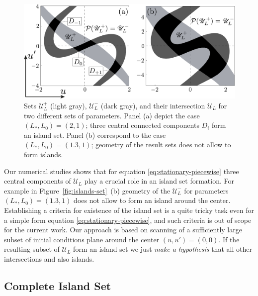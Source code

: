 \begin{figure}[h]
\centering
	\includegraphics[scale = 1]{pic/island set for piecewise equation}
	\caption{
		Sets $\mathscr{U}_L^+$ (light gray), $\mathscr{U}_L^-$ (dark gray), and their intersection $\mathscr{U}_L$ for two different sets of parameters.
		Panel (a) depict the case $(L_*, L_0) = (2, 1)$; three central connected components $D_i$ form an island set.
		Panel (b) correspond to the case $(L_*, L_0) = (1.3, 1)$; geometry of the result sets does not allow to form islands.
	}
\label{fig:island-set-piecewise}
\end{figure}

Our numerical studies shows that for equation \eqref{eq:stationary-piecewise} three central components of $\mathscr{U}_L$ play a crucial role in an island set formation.
For example in Figure~\ref{fig:islands-set}~(b) geometry of the $\mathscr{U}_L^-$ for parameters $(L_*, L_0) = (1.3, 1)$ does not allow to form an island around the center.
Establishing a criteria for existence of the island set is a quite tricky task even for a simple form equation \eqref{eq:stationary-piecewise}, and such criteria is out of scope for the current work.
Our approach is based on scanning of a sufficiently large subset of initial conditions plane around the center $(u, u') = (0, 0)$.
If the resulting subset of $\mathscr{U}_L$ form an island set we just {\it make a hypothesis} that all other intersections and also islands.

\subsection{Complete Island Set}

